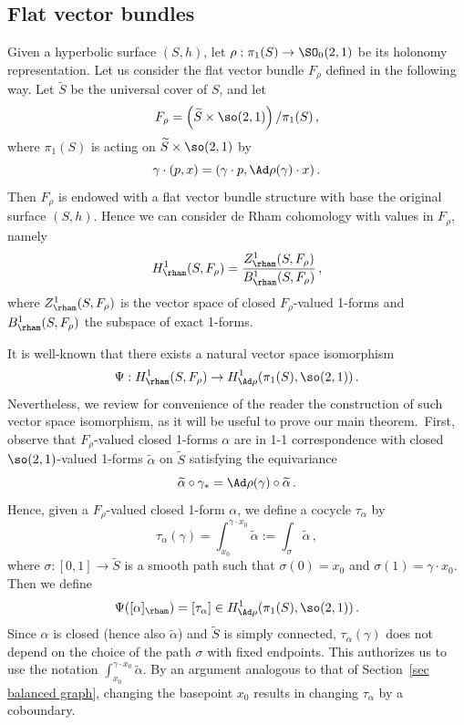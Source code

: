 \subsection{Flat vector bundles}
Given a hyperbolic surface $(S,h)$, let $\rho:\pi_1(S)\to\SO_0(2,1)$ be its holonomy representation. Let us consider the flat vector bundle $F_\rho$ defined in the following way. Let $\widetilde S$ be the universal cover of $S$, and let
\[
F_\rho=\left(\widetilde S\times \so(2,1)\right)/\pi_1(S)\,,
\]
where $\pi_1(S)$ is acting on $\widetilde S\times \so(2,1)$ by
\[
\gamma\cdot (p,x)=(\gamma\cdot p,\Ad\rho(\gamma)\cdot x)\,.
\]
Then $F_\rho$ is endowed with a flat vector bundle structure with base the original surface $(S,h)$. Hence we can consider de Rham cohomology with values in $F_\rho$, namely
\[
H^1_{\rham}(S,F_\rho)=\frac{Z^1_{\rham}(S,F_\rho)}{B^1_{\rham}(S,F_\rho)}\,,
\]
where $Z^1_{\rham}(S,F_\rho)$ is the vector space of closed $F_\rho$-valued 1-forms and $B^1_{\rham}(S,F_\rho)$ the subspace of exact 1-forms.

It is well-known that there exists a natural vector space isomorphism
\[
\Psi:H^1_{\rham}(S,F_\rho)\to H^1_{\Ad\rho}(\pi_1(S),\so(2,1))\,.
\]
Nevertheless, we review for convenience of the reader the construction of such vector space isomorphism, as it will be useful to prove our main theorem.~First, observe that $F_\rho$-valued closed 1-forms $\alpha$ are in 1-1 correspondence with closed $\so(2,1)$-valued 1-forms $\widetilde \alpha$ on $\widetilde S$ satisfying the equivariance
\begin{equation}\label{eq equivariance 1-form}
\widetilde \alpha\circ \gamma_*=\Ad\rho(\gamma)\circ \widetilde\alpha\,.
\end{equation}
Hence, given a $F_\rho$-valued closed 1-form $\alpha$, we define a cocycle $\tau_\alpha$ by
\[
\tau_\alpha(\gamma)=\int_{x_0}^{\gamma\cdot x_0}\widetilde\alpha:=\int_\sigma \widetilde\alpha\,,
\]
where $\sigma:[0,1]\to\widetilde S$ is a smooth path such that $\sigma(0)=x_0$ and $\sigma(1)=\gamma\cdot x_0$. Then we define
\[
\Psi([\alpha]_{\rham})=[\tau_\alpha]\in H^1_{\Ad\rho}(\pi_1(S),\so(2,1))\,.
\]
Since $\alpha$ is closed (hence also $\widetilde \alpha$) and $\widetilde S$ is simply connected, $\tau_\alpha(\gamma)$ does not depend on the choice of the path $\sigma$ with fixed endpoints. This authorizes us to use the notation $\int_{x_0}^{\gamma\cdot x_0}\widetilde\alpha$. By an argument analogous to that of Section~\ref{sec balanced graph}, changing the basepoint $x_0$ results in changing $\tau_\alpha$ by a coboundary.

